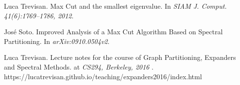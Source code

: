   
\begin{thebibliography}{1}
Luca Trevisan.
\newblock Max Cut and the smallest eigenvalue.
\newblock In {\em SIAM J. Comput. 41(6):1769–1786, 2012}.


José Soto.
\newblock Improved Analysis of a Max Cut Algorithm Based on Spectral Partitioning.
\newblock In {\em arXiv:0910.0504v2}.

Luca Trevisan.
\newblock Lecture notes for the course of Graph Partitioning, Expanders and Spectral Methods.
\newblock at {\em CS294, Berkeley, 2016 }.
https://lucatrevisan.github.io/teaching/expanders2016/index.html
\end{thebibliography}